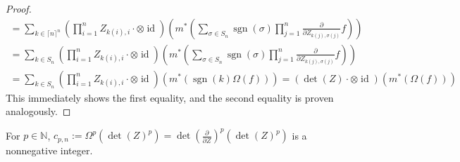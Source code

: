 \begin{proof}
\begin{equation}
\begin{aligned}
      = \sum_{k \in \lceil n \rceil^n} \left( \prod_{i=1}^n Z_{k(i),i} \cdot \otimes \operatorname{id} \right) \left( m^\ast \left( \sum_{\sigma \in S_n} \operatorname{sgn} \left( \sigma \right) \prod_{j=1}^n \frac{\partial}{\partial Z_{k(j),\sigma (j)}} f \right) \right) \\
      = \sum_{k \in S_n} \left( \prod_{i=1}^n Z_{k(i),i} \cdot \otimes \operatorname{id} \right) \left( m^\ast \left( \sum_{\sigma \in S_n} \operatorname{sgn} \left( \sigma \right) \prod_{j=1}^n \frac{\partial}{\partial Z_{k(j),\sigma (j)}} f \right) \right) \\
      = \sum_{k \in S_n} \left( \prod_{i=1}^n Z_{k(i),i} \cdot \otimes \operatorname{id} \right) \left( m^\ast \left( \operatorname{sgn} (k) \Omega (f) \right) \right)
      = \left( \operatorname{det} (Z) \cdot \otimes \operatorname{id} \right) \left( m^\ast \left( \Omega (f) \right) \right)
    \end{aligned}
  \end{equation}
  This immediately shows the first equality, and the second equality is proven analogously.
\end{proof}

\begin{lemma}
  For $p \in \mathbb{N} $, $ c_{p,n} := \Omega^p \left( \operatorname{det} (Z)^p \right) = \operatorname{det} \left( \frac{\partial}{\partial Z}\right)^p \left( \operatorname{det} (Z)^p \right)$ is a nonnegative integer.
\end{lemma}

